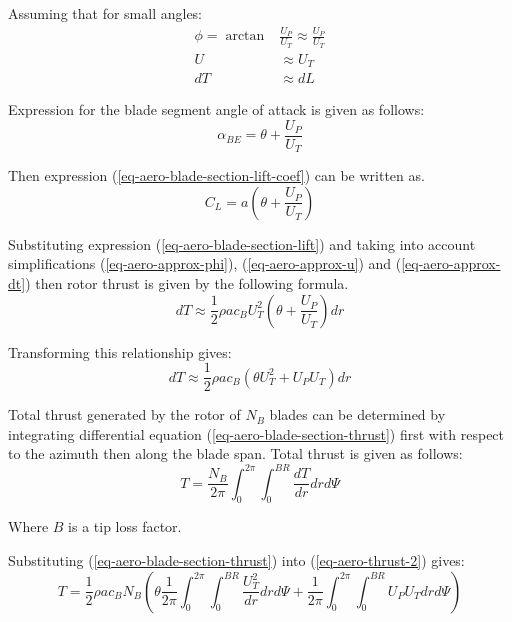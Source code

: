 Assuming that for small angles:
\begin{align}
  \label{eq-aero-approx-phi}
  \phi = \arctan &\frac{U_P}{U_T} \approx \frac{U_P}{U_T} \\
  \label{eq-aero-approx-u}
  U  &\approx U_T \\
  \label{eq-aero-approx-dt}
  dT &\approx dL
\end{align}

Expression for the blade segment angle of attack is given as follows:
\begin{equation}
  \alpha_{BE} = \theta + \frac{U_P}{U_T}
\end{equation}

Then expression (\ref{eq-aero-blade-section-lift-coef}) can be written as. \cite{GessowMyers1985}
\begin{equation}
  \label{eq-aero-rotor-list-coef}
  C_L = a \left( \theta + \frac{U_P}{U_T} \right)
\end{equation}

Substituting expression (\ref{eq-aero-blade-section-lift}) and taking into account simplifications (\ref{eq-aero-approx-phi}), (\ref{eq-aero-approx-u}) and (\ref{eq-aero-approx-dt}) then rotor thrust is given by the following formula.
\begin{equation}
  dT
  \approx
  \frac{1}{2} \rho a c_B U_T^2 \left( \theta + \frac{U_P}{U_T} \right) dr
\end{equation}

Transforming this relationship gives:
\begin{equation}
  \label{eq-aero-blade-section-thrust}
  dT
  \approx
  \frac{1}{2} \rho a c_B
  \left( \theta U_T^2 + U_P U_T \right) dr
\end{equation}

Total thrust generated by the rotor of $N_B$ blades can be determined by integrating differential equation (\ref{eq-aero-blade-section-thrust}) first with respect to the azimuth then along the blade span. \cite{GessowMyers1985} Total thrust is given as follows:
\begin{equation}
  \label{eq-aero-thrust-2}
  T = \frac{ N_B }{ 2 \pi } \int_{0}^{2 \pi} \int_{0}^{BR}
  \frac{dT}{dr} dr d\Psi
\end{equation}

Where $B$ is a tip loss factor.

Substituting (\ref{eq-aero-blade-section-thrust}) into (\ref{eq-aero-thrust-2}) gives:
\begin{equation}
  T = \frac{1}{2} \rho a c_B N_B
  \left(
  \theta \frac{1}{2 \pi}
  \int_{0}^{2\pi} \int_{0}^{BR} \frac{U_T^2}{dr} dr d\Psi
  +
  \frac{1}{2\pi} \int_{0}^{2\pi} \int_{0}^{BR} U_P U_T dr d\Psi
  \right)
\end{equation}

